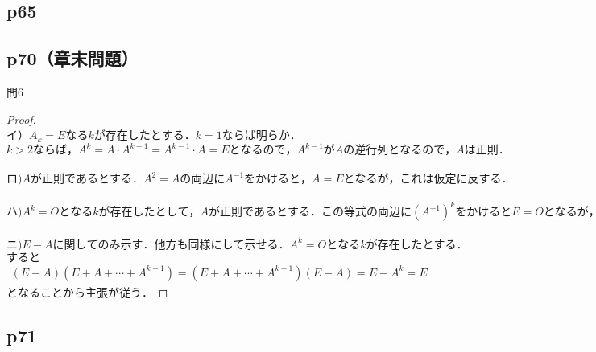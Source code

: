 \documentclass[dvipdfmx,uplatex,11pt]{jsarticle}
\theoremstyle{definition}
\begin{document}
\subsection{p65}
%
%
%
\newpage
%
%
%
\subsection{p70（章末問題）}
問6\\
\noindent
\begin{leftbar}
\begin{proof}
~\\
イ）$A_k=Eなるkが存在したとする．k = 1 ならば明らか．$\\
$k>2ならば，A^k=A·A^{k-1}=A^{k-1}· A = E となるので，A^{k-1}がAの逆行列となるので，Aは正則．$\\
\\
$ロ)Aが正則であるとする．A^2=Aの両辺にA^{-1}をかけると，A=Eとなるが，これは仮定に反する．$\\
\\
$ハ)A^k=Oとなる k が存在したとして，A が正則であるとする．この等式の両辺に (A^{−1})^kをかけるとE=Oとなるが，これは明らかに矛盾．$\\
\\
$ニ)E−A に関してのみ示す．他方も同様にして示せる．A^{k}=Oとなるkが存在したとする．$\\
$すると$
\begin{eqnarray*}
(E − A)(E+A+ \cdots +A^{k−1})=(E+A+ \cdots + A^{k−1})(E−A)=E−A^k=E
\end{eqnarray*}
$となることから主張が従う．$
\end{proof}
\end{leftbar}
%
\newpage
%
%
%
\setcounter{equation}{0}
\subsection{p71}
%
%
%
\end{document}
